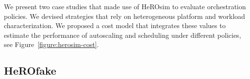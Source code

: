 


We present two case studies that made use of HeROsim to evaluate orchestration policies.
We devised strategies that rely on heterogeneous platform and workload characterization. %
We proposed a cost model that integrates these values to estimate the performance of autoscaling and scheduling under different policies, see Figure~\ref{figure:herosim-cost}.





\subsection{HeROfake}

